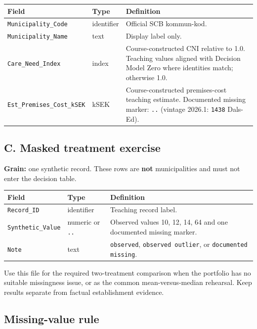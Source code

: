 \documentclass[11pt,a4paper]{article}
\begin{document}
\begin{center}
\small
\begin{tabularx}{\textwidth}{@{}p{}p{}X@{}}
\toprule
Field & Type & Definition \\
\midrule
\texttt{Municipality\_Code} & identifier & Official SCB kommun-kod. \\
\texttt{Municipality\_Name} & text & Display label only. \\
\texttt{Care\_Need\_Index} & index & Course-constructed CNI relative
to 1.0. Teaching values aligned with Decision Model Zero where
identities match; otherwise 1.0. \\
\texttt{Est\_Premises\_Cost\_kSEK} & kSEK & Course-constructed
premises-cost teaching estimate. Documented missing marker:
\texttt{..} (vintage 2026.1: \texttt{1438} Dals-Ed). \\
\bottomrule
\end{tabularx}
\end{center}

\subsection*{C. Masked treatment exercise}

\textbf{Grain:} one synthetic record. These rows are \textbf{not}
municipalities and must not enter the decision table.

\begin{center}
\small
\begin{tabularx}{\textwidth}{@{}p{}p{}X@{}}
\toprule
Field & Type & Definition \\
\midrule
\texttt{Record\_ID} & identifier & Teaching record label. \\
\texttt{Synthetic\_Value} & numeric or \texttt{..} & Observed values
10, 12, 14, 64 and one documented missing marker. \\
\texttt{Note} & text & \texttt{observed}, \texttt{observed outlier},
or \texttt{documented missing}. \\
\bottomrule
\end{tabularx}
\end{center}

Use this file for the required two-treatment comparison when the
portfolio has no suitable missingness issue, or as the common
mean-versus-median rehearsal. Keep results separate from factual
establishment evidence.

\subsection*{Missing-value rule}
\end{document}
